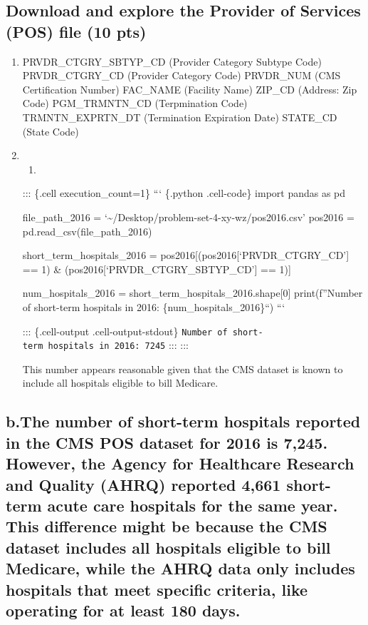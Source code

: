 \documentclass[
  letterpaper,
  DIV=11,
  numbers=noendperiod]{scrartcl}
\providecommand{\tightlist}{%
  \setlength{\itemsep}{0pt}\setlength{\parskip}{0pt}}\usepackage{longtable,booktabs,array}
\begin{document}
\subsection{Download and explore the Provider of Services (POS) file (10
pts)}\label{download-and-explore-the-provider-of-services-pos-file-10-pts}

\begin{enumerate}
\def\labelenumi{\arabic{enumi}.}
\item
  PRVDR\_CTGRY\_SBTYP\_CD (Provider Category Subtype Code)
  PRVDR\_CTGRY\_CD (Provider Category Code) PRVDR\_NUM (CMS
  Certification Number) FAC\_NAME (Facility Name) ZIP\_CD (Address: Zip
  Code) PGM\_TRMNTN\_CD (Terpmination Code) TRMNTN\_EXPRTN\_DT
  (Termination Expiration Date) STATE\_CD (State Code)
\item
  \begin{enumerate}
  \def\labelenumii{\alph{enumii}.}
  \tightlist
  \item
  \end{enumerate}

  ::: \{.cell execution\_count=1\} ``` \{.python .cell-code\} import
  pandas as pd

  file\_path\_2016 =
  `\textasciitilde/Desktop/problem-set-4-xy-wz/pos2016.csv' pos2016 =
  pd.read\_csv(file\_path\_2016)

  short\_term\_hospitals\_2016 =
  pos2016{[}(pos2016{[}`PRVDR\_CTGRY\_CD'{]} == 1) \&
  (pos2016{[}`PRVDR\_CTGRY\_SBTYP\_CD'{]} == 1){]}

  num\_hospitals\_2016 = short\_term\_hospitals\_2016.shape{[}0{]}
  print(f''Number of short-term hospitals in 2016:
  \{num\_hospitals\_2016\}``) ```

  ::: \{.cell-output .cell-output-stdout\}
  \texttt{Number\ of\ short-term\ hospitals\ in\ 2016:\ 7245} ::: :::

  This number appears reasonable given that the CMS dataset is known to
  include all hospitals eligible to bill Medicare.
\end{enumerate}

\subsection{b.The number of short-term hospitals reported in the CMS POS
dataset for 2016 is 7,245. However, the Agency for Healthcare Research
and Quality (AHRQ) reported 4,661 short-term acute care hospitals for
the same year. This difference might be because the CMS dataset includes
all hospitals eligible to bill Medicare, while the AHRQ data only
includes hospitals that meet specific criteria, like operating for at
least 180
days.}\label{b.the-number-of-short-term-hospitals-reported-in-the-cms-pos-dataset-for-2016-is-7245.-however-the-agency-for-healthcare-research-and-quality-ahrq-reported-4661-short-term-acute-care-hospitals-for-the-same-year.-this-difference-might-be-because-the-cms-dataset-includes-all-hospitals-eligible-to-bill-medicare-while-the-ahrq-data-only-includes-hospitals-that-meet-specific-criteria-like-operating-for-at-least-180-days.}
\end{document}
